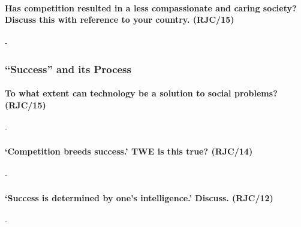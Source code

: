 \documentclass[../../main]{subfiles}
\begin{document}
\paragraph{Has competition resulted in a less compassionate and caring society? Discuss this with reference to your country. (RJC/15)}-

\subsubsection{``Success'' and its Process}

\paragraph{To what extent can technology be a solution to social problems? (RJC/15)}-

\paragraph{`Competition breeds success.' TWE is this true? (RJC/14)}-

\paragraph{`Success is determined by one's intelligence.' Discuss. (RJC/12)}-
\end{document}
